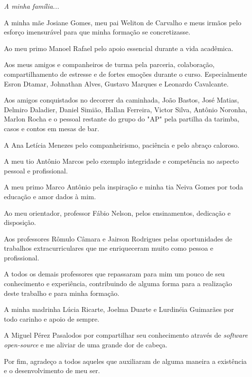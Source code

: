 \newpage
\vspace*{\fill}
\begin{flushright}
		\textit{A minha família...}
\end{flushright}

\begin{agradecimentos}
	
	A minha mãe Josiane Gomes, meu pai Weliton de Carvalho e meus irmãos pelo esforço imensurável para que minha formação se concretizasse.
	
	Ao meu primo Manoel Rafael pelo apoio essencial durante a vida acadêmica.
	
	Aos meus amigos e companheiros de turma pela parceria, colaboração, compartilhamento de estresse e de fortes emoções durante o curso. Especialmente Esron Dtamar, Johnathan Alves, Gustavo Marques e Leonardo Cavalcante.
	
	Aos amigos conquistados no decorrer da caminhada, João Bastos, José Matias, Delmiro Daladier, Daniel Simião, Hallan Ferreira, Victor Silva, Antônio Noronha, Marlon Rocha e o pessoal restante do grupo do "AP" pela partilha da tarimba, casos e contos em mesas de bar.
	
	A Ana Letícia Menezes pelo companheirismo, paciência e pelo abraço caloroso.
	
	A meu tio Antônio Marcos pelo exemplo integridade e competência no aspecto pessoal e profissional.
	
	A meu primo Marco Antônio pela inspiração e minha tia Neiva Gomes por toda educação e amor dados à mim.
	
	Ao meu orientador, professor Fábio Nelson, pelos ensinamentos, dedicação e disposição.
	
	Aos professores Rômulo Câmara e Jairson Rodrigues pelas oportunidades de trabalhos extracurriculares que me enriqueceram muito como pessoa e profissional.
	
	A todos os demais professores que repassaram para mim um pouco de seu conhecimento e experiência, contribuindo de alguma forma para a realização deste trabalho e para minha formação.
	
	A minha madrinha Lúcia Ricarte, Joelma Duarte e Lurdinéia Guimarães por todo carinho e apoio de sempre.

	A Miguel Pérez Pasalodos por compartilhar seu conhecimento através de \textit{software open-source} e me aliviar de uma grande dor de cabeça.
	 
	Por fim, agradeço a todos aqueles que auxiliaram de alguma maneira a existência e o desenvolvimento de meu ser.

\end{agradecimentos}

